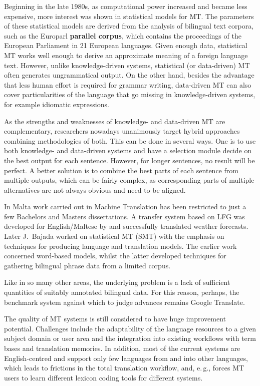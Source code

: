 \begin{multicols}{2}
Beginning in the late 1980s, as computational power increased and became less expensive, more interest was shown in statistical models for MT. The parameters of these statistical models are derived from the analysis of bilingual text corpora, such as the Europarl \textbf{parallel corpus}, which contains the proceedings of the European Parliament in 21 European languages. Given enough data, statistical MT works well enough to derive an approximate meaning of a foreign language text. However, unlike knowledge-driven systems, statistical (or data-driven) MT often generates ungrammatical output. On the other hand, besides the advantage that less human effort is required for grammar writing, data-driven MT can also cover particularities of the language that go missing in knowledge-driven systems, for example idiomatic expressions. 

As the strengths and weaknesses of knowledge- and data-driven MT are complementary, researchers nowadays unanimously target hybrid approaches combining methodologies of both. This can be done in several ways. One is to use both knowledge- and data-driven systems and have a selection module decide on the best output for each sentence. However, for longer sentences, no result will be perfect. A better solution is to combine the best parts of each sentence from multiple outputs, which can be fairly complex, as corresponding parts of multiple alternatives are not always obvious and need to be aligned. 


In Malta work carried out in Machine Translation has been restricted to just a few Bachelors and Masters dissertations. A transfer system based on LFG was developed for English/Maltese by \cite{Farrugia:2000} and successfully translated weather forecasts. Later J.~Bajada \cite{Bajada:2004, Bajada:2009} worked on statistical MT (SMT) with the emphasis on techniques for producing language and translation models. The earlier work concerned word-based models, whilst the latter developed techniques for gathering bilingual phrase data from a limited corpus.

Like in so many other areas, the underlying problem is a lack of sufficient quantities of suitably annotated bilingual data. For this reason, perhaps, the benchmark system against which to judge advances remains Google Translate.

The quality of MT systems is still considered to have huge improvement potential. Challenges include the adaptability of the language resources to a given subject domain or user area and the integration into existing workflows with term bases and translation memories. In addition, most of the current systems are English-centred and support only few languages from and into other languages, which leads to frictions in the total translation workflow, and, e.\,g., forces MT users to learn different lexicon coding tools for different systems.


\end{multicols}
